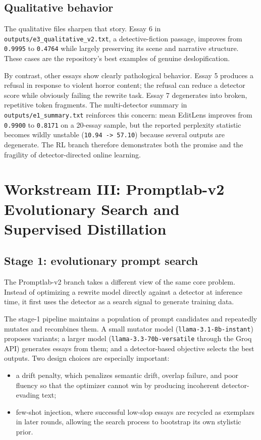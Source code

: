\documentclass[11pt]{article}
\begin{document}
\subsection{Qualitative behavior}

The qualitative files sharpen that story. Essay 6 in \texttt{outputs/e3\_qualitative\_v2.txt}, a detective-fiction passage, improves from \texttt{0.9995} to \texttt{0.4764} while largely preserving its scene and narrative structure. These cases are the repository's best examples of genuine deslopification.

By contrast, other essays show clearly pathological behavior. Essay 5 produces a refusal in response to violent horror content; the refusal can reduce a detector score while obviously failing the rewrite task. Essay 7 degenerates into broken, repetitive token fragments. The multi-detector summary in \texttt{outputs/e1\_summary.txt} reinforces this concern: mean EditLens improves from \texttt{0.9900} to \texttt{0.8171} on a 20-essay sample, but the reported perplexity statistic becomes wildly unstable (\texttt{10.94 -> 57.10}) because several outputs are degenerate. The RL branch therefore demonstrates both the promise and the fragility of detector-directed online learning.

\section{Workstream III: Promptlab-v2 Evolutionary Search and Supervised Distillation}

\subsection{Stage 1: evolutionary prompt search}

The Promptlab-v2 branch takes a different view of the same core problem. Instead of optimizing a rewrite model directly against a detector at inference time, it first uses the detector as a search signal to generate training data.

The stage-1 pipeline maintains a population of prompt candidates and repeatedly mutates and recombines them. A small mutator model (\texttt{llama-3.1-8b-instant}) proposes variants; a larger model (\texttt{llama-3.3-70b-versatile} through the Groq API) generates essays from them; and a detector-based objective selects the best outputs. Two design choices are especially important:

\begin{itemize}[leftmargin=1.2em]
\item a drift penalty, which penalizes semantic drift, overlap failure, and poor fluency so that the optimizer cannot win by producing incoherent detector-evading text;
\item few-shot injection, where successful low-slop essays are recycled as exemplars in later rounds, allowing the search process to bootstrap its own stylistic prior.
\end{itemize}
\end{document}
